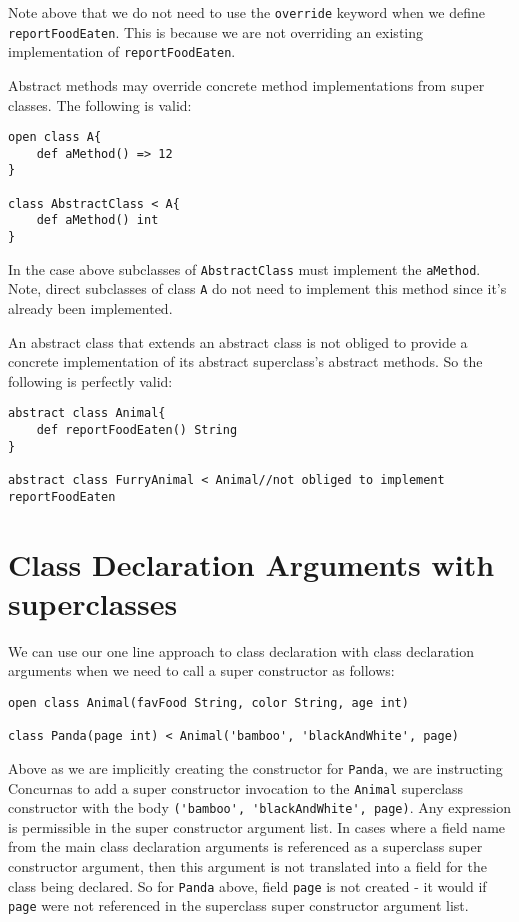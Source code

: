 \documentclass[conc-doc]{subfiles}
\begin{document}
Note above that we do not need to use the \lstinline{override} keyword when we define \lstinline{reportFoodEaten}. This is because we are not overriding an existing implementation of \lstinline{reportFoodEaten}.

Abstract methods may override concrete method implementations from super classes. The following is valid:

\begin{lstlisting}
open class A{
	def aMethod() => 12
}

class AbstractClass < A{
	def aMethod() int
}
\end{lstlisting}

In the case above subclasses of \lstinline{AbstractClass} must implement the \lstinline{aMethod}. Note, direct subclasses of class \lstinline{A} do not need to implement this method since it's already been implemented.

An abstract class that extends an abstract class is not obliged to provide a concrete implementation of its abstract superclass's abstract methods. So the following is perfectly valid:

\begin{lstlisting}
abstract class Animal{
	def reportFoodEaten() String
}

abstract class FurryAnimal < Animal//not obliged to implement reportFoodEaten
\end{lstlisting}

\section{Class Declaration Arguments with superclasses}
We can use our one line approach to class declaration with class declaration arguments when we need to call a super constructor as follows:

\begin{lstlisting}
open class Animal(favFood String, color String, age int)

class Panda(page int) < Animal('bamboo', 'blackAndWhite', page)
\end{lstlisting}

Above as we are implicitly creating the constructor for \lstinline{Panda}, we are instructing Concurnas to add a super constructor invocation to the \lstinline{Animal} superclass constructor with the body \lstinline{('bamboo', 'blackAndWhite', page)}. Any expression is permissible in the super constructor argument list. In cases where a field name from the main class declaration arguments is referenced as a superclass super constructor argument, then this argument is not translated into a field for the class being declared. So for \lstinline{Panda} above, field \lstinline{page} is not created - it would if \lstinline{page} were not referenced in the superclass super constructor argument list.
\end{document}
